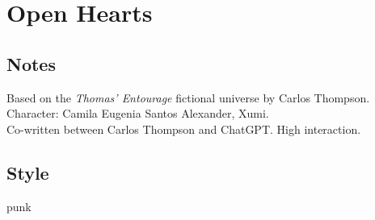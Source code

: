 \section{Open Hearts}

\subsection{Notes}
Based on the \emph{Thomas' Entourage} fictional universe by Carlos Thompson.\\
Character: Camila Eugenia Santos Alexander, Xumi.\\
Co-written between Carlos Thompson and ChatGPT. High interaction.

\subsection{Style}
punk

